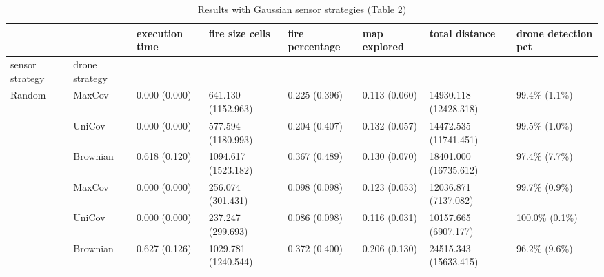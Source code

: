 \begin{table}[htbp]
\begin{minipage}{0.48\textwidth}
{\begin{minipage}{.85\textheight}
{\begin{tabular}{llllllll}
\toprule
 &  & execution time & fire size cells & fire percentage & map explored & total distance & drone detection pct \\
\midrule
sensor strategy & drone strategy &  &  &  &  &  &  \\
\midrule
\midrule
\multirow[t]{4}{*}{ Random} & MaxCov & 0.000 (0.000) & 641.130 (1152.963) & 0.225 (0.396) & 0.113 (0.060) & 14930.118 (12428.318) & 99.4\% (1.1\%) \\
\midrule
 & UniCov & 0.000 (0.000) & 577.594 (1180.993) & 0.204 (0.407) & 0.132 (0.057) & 14472.535 (11741.451) & 99.5\% (1.0\%) \\
\midrule
 & Brownian & 0.618 (0.120) & 1094.617 (1523.182) & 0.367 (0.489) & 0.130 (0.070) & 18401.000 (16735.612) & 97.4\% (7.7\%) \\
\midrule
\cline{1-8}
\multirow[t]{4}{*}{GaussianCov} & MaxCov & 0.000 (0.000) & 256.074 (301.431) & 0.098 (0.098) & 0.123 (0.053) & 12036.871 (7137.082) & 99.7\% (0.9\%) \\
\midrule
 & UniCov & 0.000 (0.000) & 237.247 (299.693) & 0.086 (0.098) & 0.116 (0.031) & 10157.665 (6907.177) & 100.0\% (0.1\%) \\
\midrule
 & Brownian & 0.627 (0.126) & 1029.781 (1240.544) & 0.372 (0.400) & 0.206 (0.130) & 24515.343 (15633.415) & 96.2\% (9.6\%) \\
\midrule
\cline{1-8}
\bottomrule
\end{tabular}}
\caption{Results with Gaussian sensor strategies (Table 2)}\label{additional_metrics_bp}
\end{minipage}}
\end{minipage}
\end{table}